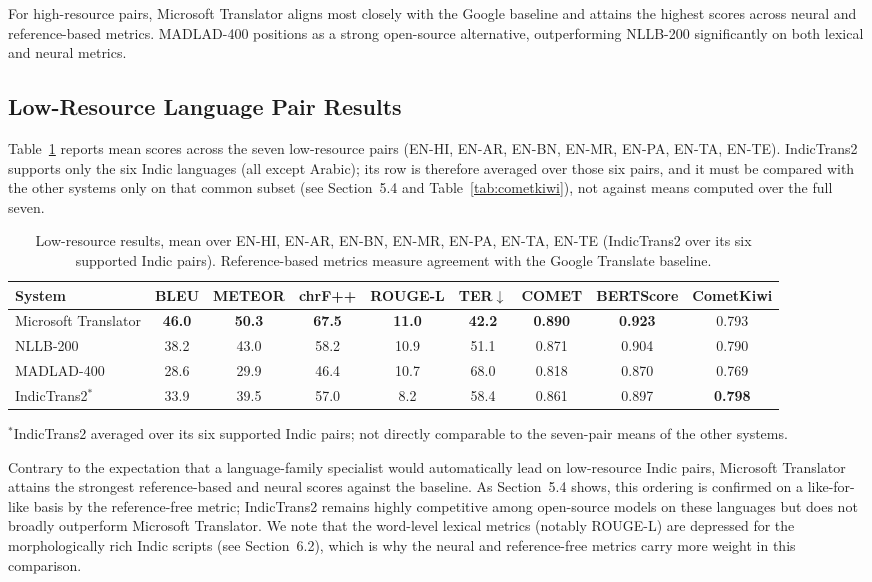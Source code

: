 \documentclass[Afour,sagev,times,doublespace]{sagej}
\begin{document}
For high-resource pairs, Microsoft Translator aligns most closely with the Google baseline and attains the highest scores across neural and reference-based metrics. MADLAD-400 positions as a strong open-source alternative, outperforming NLLB-200 significantly on both lexical and neural metrics.

\subsection{Low-Resource Language Pair Results}

Table~\ref{tab:low} reports mean scores across the seven low-resource pairs (EN-HI, EN-AR, EN-BN, EN-MR, EN-PA, EN-TA, EN-TE). IndicTrans2 supports only the six Indic languages (all except Arabic); its row is therefore averaged over those six pairs, and it must be compared with the other systems only on that common subset (see Section~5.4 and Table~\ref{tab:cometkiwi}), not against means computed over the full seven.

\begin{table}[t]
\small\sf\centering
\caption{Low-resource results, mean over EN-HI, EN-AR, EN-BN, EN-MR, EN-PA, EN-TA, EN-TE (IndicTrans2 over its six supported Indic pairs). Reference-based metrics measure agreement with the Google Translate baseline.\label{tab:low}}
\begin{tabular}{@{}lcccccccc@{}}
\toprule
System & BLEU & METEOR & chrF++ & ROUGE-L & TER$\downarrow$ & COMET & BERTScore & CometKiwi \\
\midrule
Microsoft Translator & \textbf{46.0} & \textbf{50.3} & \textbf{67.5} & \textbf{11.0} & \textbf{42.2} & \textbf{0.890} & \textbf{0.923} & 0.793 \\
NLLB-200 & 38.2 & 43.0 & 58.2 & 10.9 & 51.1 & 0.871 & 0.904 & 0.790 \\
MADLAD-400 & 28.6 & 29.9 & 46.4 & 10.7 & 68.0 & 0.818 & 0.870 & 0.769 \\
IndicTrans2$^{*}$ & 33.9 & 39.5 & 57.0 & 8.2 & 58.4 & 0.861 & 0.897 & \textbf{0.798} \\
\bottomrule
\end{tabular}
\end{table}

\noindent$^{*}$IndicTrans2 averaged over its six supported Indic pairs; not directly comparable to the seven-pair means of the other systems.

Contrary to the expectation that a language-family specialist would automatically lead on low-resource Indic pairs, Microsoft Translator attains the strongest reference-based and neural scores against the baseline. As Section~5.4 shows, this ordering is confirmed on a like-for-like basis by the reference-free metric; IndicTrans2 remains highly competitive among open-source models on these languages but does not broadly outperform Microsoft Translator. We note that the word-level lexical metrics (notably ROUGE-L) are depressed for the morphologically rich Indic scripts (see Section~6.2), which is why the neural and reference-free metrics carry more weight in this comparison.
\end{document}
